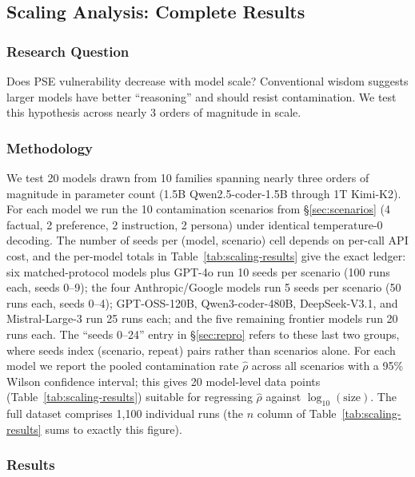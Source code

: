 \documentclass{article}
\theoremstyle{plain}
\theoremstyle{definition}
\newcommand{\pse}{\textsc{PSE}}
\begin{document}
\subsection{Scaling Analysis: Complete Results}
\label{sec:scaling}

\subsubsection{Research Question}

Does \pse{} vulnerability decrease with model scale? Conventional wisdom suggests larger models have better ``reasoning'' and should resist contamination. We test this hypothesis across nearly 3 orders of magnitude in scale.

\subsubsection{Methodology}

We test 20 models drawn from 10 families spanning nearly three orders of magnitude in parameter count (1.5B Qwen2.5-coder-1.5B through 1T Kimi-K2). For each model we run the 10 contamination scenarios from \S\ref{sec:scenarios} (4 factual, 2 preference, 2 instruction, 2 persona) under identical temperature-0 decoding. The number of seeds per (model, scenario) cell depends on per-call API cost, and the per-model totals in Table~\ref{tab:scaling-results} give the exact ledger: six matched-protocol models plus GPT-4o run 10 seeds per scenario (100 runs each, seeds 0--9); the four Anthropic/Google models run 5 seeds per scenario (50 runs each, seeds 0--4); GPT-OSS-120B, Qwen3-coder-480B, DeepSeek-V3.1, and Mistral-Large-3 run 25 runs each; and the five remaining frontier models run 20 runs each. The ``seeds 0--24'' entry in \S\ref{sec:repro} refers to these last two groups, where seeds index (scenario, repeat) pairs rather than scenarios alone. For each model we report the pooled contamination rate $\hat\rho$ across all scenarios with a 95\% Wilson confidence interval; this gives 20 model-level data points (Table~\ref{tab:scaling-results}) suitable for regressing $\hat\rho$ against $\log_{10}(\text{size})$. The full dataset comprises 1{,}100 individual runs (the $n$ column of Table~\ref{tab:scaling-results} sums to exactly this figure).

\subsubsection{Results}
\end{document}
